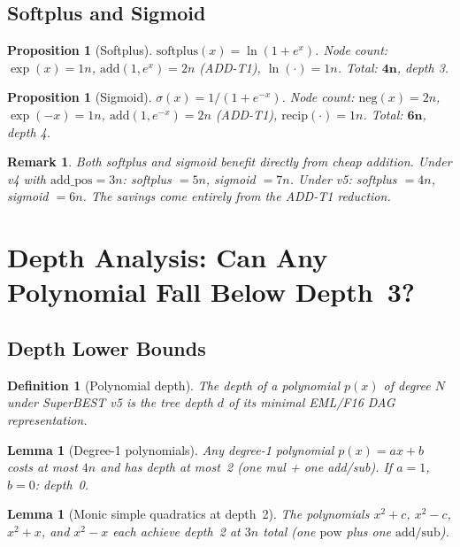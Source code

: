\documentclass[11pt,a4paper]{article}
\newtheorem{proposition}[theorem]{Proposition}
\newtheorem{lemma}[theorem]{Lemma}
\newtheorem{definition}{Definition}[section]
\newtheorem{remark}{Remark}[section]
\begin{document}
\subsection{Softplus and Sigmoid}

\begin{proposition}[Softplus]
  $\mathrm{softplus}(x) = \ln(1 + e^x)$. Node count: $\exp(x) = 1n$,
  $\mathrm{add}(1, e^x) = 2n$ (ADD-T1), $\ln(\cdot) = 1n$. Total: $\mathbf{4n}$, depth 3.
\end{proposition}

\begin{proposition}[Sigmoid]
  $\sigma(x) = 1/(1+e^{-x})$. Node count: $\mathrm{neg}(x) = 2n$, $\exp(-x) = 1n$,
  $\mathrm{add}(1, e^{-x}) = 2n$ (ADD-T1), $\mathrm{recip}(\cdot) = 1n$. Total: $\mathbf{6n}$, depth 4.
\end{proposition}

\begin{remark}
  Both softplus and sigmoid benefit directly from cheap addition. Under v4 with
  $\text{add\_pos} = 3n$: softplus $= 5n$, sigmoid $= 7n$. Under v5: softplus $= 4n$,
  sigmoid $= 6n$. The savings come entirely from the ADD-T1 reduction.
\end{remark}

\section{Depth Analysis: Can Any Polynomial Fall Below Depth~3?}

\subsection{Depth Lower Bounds}

\begin{definition}[Polynomial depth]
  The \emph{depth} of a polynomial $p(x)$ of degree $N$ under SuperBEST v5 is the tree
  depth $d$ of its minimal EML/F16 DAG representation.
\end{definition}

\begin{lemma}[Degree-1 polynomials]
  Any degree-1 polynomial $p(x) = ax + b$ costs at most $4n$ and has depth at most~2
  (one mul + one add/sub). If $a = 1$, $b = 0$: depth~0.
\end{lemma}

\begin{lemma}[Monic simple quadratics at depth~2]
  The polynomials $x^2 + c$, $x^2 - c$, $x^2 + x$, and $x^2 - x$ each achieve depth~2
  at $3n$ total (one $\mathrm{pow}$ plus one $\mathrm{add/sub}$).
\end{lemma}
\end{document}
